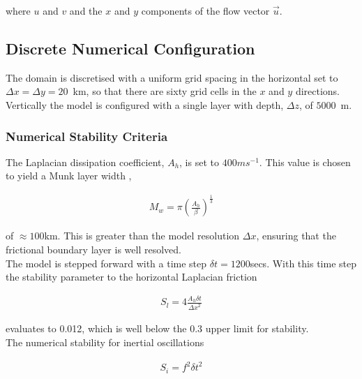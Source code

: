 \noindent where $u$ and $v$ and the $x$ and $y$ components of the
flow vector $\vec{u}$.
\\


\subsection{Discrete Numerical Configuration}
\label{www:tutorials}

 The domain is discretised with 
a uniform grid spacing in the horizontal set to
 $\Delta x=\Delta y=20$~km, so 
that there are sixty grid cells in the $x$ and $y$ directions. Vertically the 
model is configured with a single layer with depth, $\Delta z$, of $5000$~m. 

\subsubsection{Numerical Stability Criteria}
\label{www:tutorials}

The Laplacian dissipation coefficient, $A_{h}$, is set to $400 m s^{-1}$.
This value is chosen to yield a Munk layer width \cite{adcroft:95},

\begin{eqnarray}
\label{EQ:eg-baro-munk_layer}
M_{w} = \pi ( \frac { A_{h} }{ \beta } )^{\frac{1}{3}}
\end{eqnarray}

\noindent  of $\approx 100$km. This is greater than the model
resolution $\Delta x$, ensuring that the frictional boundary
layer is well resolved.
\\

\noindent The model is stepped forward with a 
time step $\delta t=1200$secs. With this time step the stability 
parameter to the horizontal Laplacian friction \cite{adcroft:95}



\begin{eqnarray}
\label{EQ:eg-baro-laplacian_stability}
S_{l} = 4 \frac{A_{h} \delta t}{{\Delta x}^2}
\end{eqnarray}

\noindent evaluates to 0.012, which is well below the 0.3 upper limit
for stability. 
\\

\noindent The numerical stability for inertial oscillations  
\cite{adcroft:95} 

\begin{eqnarray}
\label{EQ:eg-baro-inertial_stability}
S_{i} = f^{2} {\delta t}^2
\end{eqnarray}

